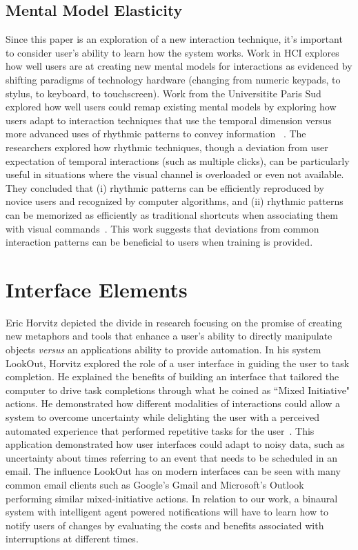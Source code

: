 \subsection{                   Mental Model Elasticity                       }

Since this paper is an exploration of a new interaction technique, it's important to
consider user's ability to learn how the system works. Work in HCI explores how
well users are at creating new mental models for interactions as evidenced by
shifting paradigms of technology hardware (changing from numeric keypads, to
stylus, to keyboard, to touchscreen).  Work from the Universitite Paris Sud
explored how well users could remap existing mental models by exploring how
users adapt to interaction techniques that use the temporal dimension versus
more advanced uses of rhythmic patterns to convey information
~\cite{ghomi2012using}.  The researchers
explored how rhythmic techniques, though a deviation from  user expectation of
temporal interactions (such as multiple clicks), can be particularly useful in
situations where the visual channel is overloaded or even not available.  They
concluded that  (i) rhythmic patterns can be efficiently reproduced by novice
users and recognized by computer algorithms, and (ii) rhythmic patterns can be
memorized as efficiently as traditional shortcuts when associating them with
visual commands~\cite{ghomi2012using}.  This work suggests that deviations from
common interaction patterns can be beneficial to users when training is provided.

\section{                  Interface Elements                                }

Eric Horvitz depicted the divide in research focusing on the promise of creating
new metaphors and tools that enhance a user's ability to directly manipulate
objects \textit{versus} an applications ability to provide automation. In his
system LookOut, Horvitz explored the role of a user interface in guiding the
user to task completion.  He explained the benefits of building an interface
that tailored the computer to drive task completions through what he coined as
``Mixed Initiative" actions.  He demonstrated how different modalities of
interactions could allow a system to overcome uncertainty while delighting the
user with a perceived automated experience that performed repetitive tasks for
the user~\cite{horvitz1999principles}.  This application demonstrated how user
interfaces could adapt to noisy data, such as uncertainty about times referring
to an event that needs to be scheduled in an email. The influence LookOut has on
modern interfaces can be seen with many common email clients such as Google's
Gmail and Microsoft's Outlook performing similar mixed-initiative actions.  In
relation to our work, a binaural system with intelligent agent powered notifications
will have to learn how to notify users of changes by evaluating the costs and
benefits associated with interruptions at different times.

